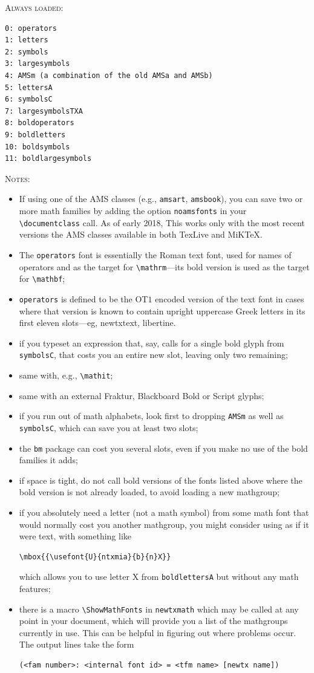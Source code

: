 \documentclass[\fsc]{article}
\theoremstyle{oldplain}
\theoremstyle{plain}
\begin{document}
\textsc{Always loaded:}
\begin{verbatim}
0: operators
1: letters
2: symbols
3: largesymbols
4: AMSm (a combination of the old AMSa and AMSb)
5: lettersA
6: symbolsC
7: largesymbolsTXA
8: boldoperators
9: boldletters
10: boldsymbols
11: boldlargesymbols
\end{verbatim}
\textsc{Notes:}
\begin{itemize}
\item If using one of the AMS classes (e.g., {\tt amsart}, {\tt amsbook}), you can save two or more math families by adding the option {\tt noamsfonts} in your \verb|\documentclass| call. As of early 2018, This works only with the most recent versions the AMS classes available in both TexLive and MiKTeX. 
\item
The {\tt operators} font is essentially the Roman text font, used for names of operators and as the target for \verb|\mathrm|---its bold version is used as the target for \verb|\mathbf|;
\item {\tt operators} is defined to be the OT$1$ encoded version of the text font in cases where that version is known to contain upright uppercase Greek letters in its first eleven slots---eg, newtxtext, libertine.
\item if you typeset an expression that, say, calls for a single bold glyph from  {\tt symbolsC}, that costs you an entire new slot, leaving only two remaining;
\item same with, e.g., \verb|\mathit|;
\item same with an external Fraktur, Blackboard Bold or Script glyphs;
\item if you run out of math alphabets, look first to dropping {\tt AMSm}  as well as {\tt symbolsC}, which can save you at least two slots;
\item the {\tt bm} package can cost you several slots, even if you make no use of the bold families it adds;
\item if space is tight, do not call bold versions of the fonts listed above where the bold version is not already loaded, to avoid loading a new mathgroup; 
\item if you absolutely need a letter (not a math symbol) from some math font that would normally cost you another mathgroup, you might consider using as if it were text, with something like
\begin{verbatim}
\mbox{{\usefont{U}{ntxmia}{b}{n}X}}
\end{verbatim}
which allows you to use letter X from {\tt boldlettersA} but without any math features;
\item there is a macro \verb|\ShowMathFonts| in {\tt newtxmath} which may be called at any point in your document, which will provide you a list of the mathgroups currently in use. This can be helpful in figuring out where problems occur. The output lines take the form
\begin{verbatim}
(<fam number>: <internal font id> = <tfm name> [newtx name])
\end{verbatim}

\end{itemize}
\end{document}

